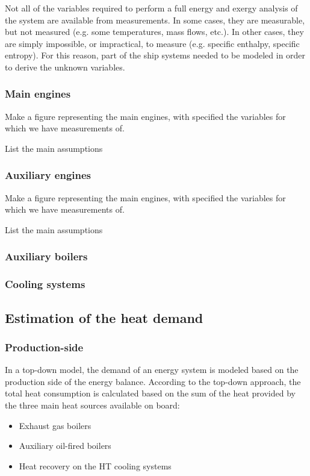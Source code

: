 \documentclass[preprint,12pt]{elsarticle}
\begin{document}
Not all of the variables required to perform a full energy and exergy analysis of the system are available from measurements. In some cases, they are measurable, but not measured (e.g. some temperatures, mass flows, etc.). In other cases, they are simply impossible, or impractical, to measure (e.g. specific enthalpy, specific entropy). For this reason, part of the ship systems needed to be modeled in order to derive the unknown variables. 

\subsubsection*{Main engines}

Make a figure representing the main engines, with specified the variables for which we have measurements of. 

List the main assumptions

\subsubsection*{Auxiliary engines}

Make a figure representing the main engines, with specified the variables for which we have measurements of. 

List the main assumptions

\subsubsection*{Auxiliary boilers}

\subsubsection*{Cooling systems}

\subsection{Estimation of the heat demand} \label{sec:met:heat}

\subsubsection*{Production-side}

In a top-down model, the demand of an energy system is modeled based on the production side of the energy balance. According to the top-down approach, the total heat consumption is calculated based on the sum of the heat provided by the three main heat sources available on board:
\begin{itemize}
	\item Exhaust gas boilers
	\item Auxiliary oil-fired boilers
	\item Heat recovery on the HT cooling systems
\end{itemize}
\end{document}
